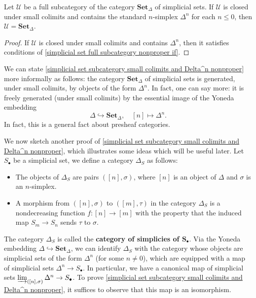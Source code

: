 \begin{corollary}\label{simplicial set subcategory small colimits and Delta^n nonproper}
Let $\mathcal{U}$ be a full subcategory of the category $\mathbf{Set}_\Delta$ of simplicial sets. If $\mathcal{U}$ is closed under small colimits and contains the standard $n$-simplex $\Delta^n$ for each $n\leq 0$, then $\mathcal{U}=\mathbf{Set}_\Delta$.
\end{corollary}
\begin{proof}
If $\mathcal{U}$ is closed under small colimits and contains $\Delta^n$, then it satisfies conditions of \cref{simplicial set full subcategory nonproper if}.
\end{proof}
\begin{remark}
We can state \cref{simplicial set subcategory small colimits and Delta^n nonproper} more informally as follows: the category $\mathbf{Set}_\Delta$ of simplicial sets is generated, under small colimits, by objects of the form $\Delta^n$. In fact, one can say more: it is freely generated (under small colimits) by the essential image of the Yoneda embedding
\[\Delta\hookrightarrow\mathbf{Set}_\Delta,\quad [n]\mapsto\Delta^n.\]
In fact, this is a general fact about presheaf categories.
\end{remark}
We now sketch another proof of \cref{simplicial set subcategory small colimits and Delta^n nonproper}, which illustrates some ideas which will be useful later. Let $S_\bullet$ be a simplicial set, we define a category $\Delta_S$ as follows:
\begin{itemize}
\item The objects of $\Delta_S$ are pairs $([n],\sigma)$, where $[n]$ is an object of $\Delta$ and $\sigma$ is an $n$-simplex.
\item A morphism from $([n],\sigma)$ to $([m],\tau)$ in the category $\Delta_S$ is a nondecreasing function $f:[n]\to[m]$ with the property that the induced map $S_m\to S_n$ sends $\tau$ to $\sigma$.
\end{itemize}
The category $\Delta_S$ is called the \textbf{category of simplicies of $\bm{S_\bullet}$}. Via the Yoneda embedding $\Delta\hookrightarrow\mathbf{Set}_\Delta$, we can identify $\Delta_S$ with the category whose objects are simplicial sets of the form $\Delta^n$ (for some $n\neq 0$), which are equipped with a map of simplicial sets $\Delta^n\to S_\bullet$. In particular, we have a canonical map of simplicial sets $\varinjlim_{([n],\sigma)}\Delta^n\to S_\bullet$. To prove \cref{simplicial set subcategory small colimits and Delta^n nonproper}, it suffices to observe that this map is an isomorphism.\par
